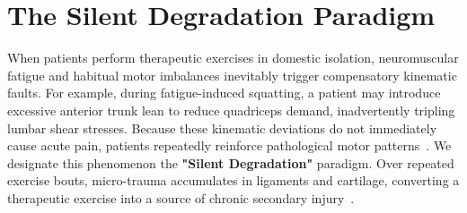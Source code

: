 \documentclass[12pt]{report}
\begin{document}
\section{The Silent Degradation Paradigm}
When patients perform therapeutic exercises in domestic isolation, neuromuscular fatigue and habitual motor imbalances inevitably trigger compensatory kinematic faults. For example, during fatigue-induced squatting, a patient may introduce excessive anterior trunk lean to reduce quadriceps demand, inadvertently tripling lumbar shear stresses. Because these kinematic deviations do not immediately cause acute pain, patients repeatedly reinforce pathological motor patterns~\cite{krogsgaard2002sensory}. We designate this phenomenon the \textbf{"Silent Degradation"} paradigm. Over repeated exercise bouts, micro-trauma accumulates in ligaments and cartilage, converting a therapeutic exercise into a source of chronic secondary injury~\cite{hewett2005biomechanical, powers2010influence}.
\end{document}
